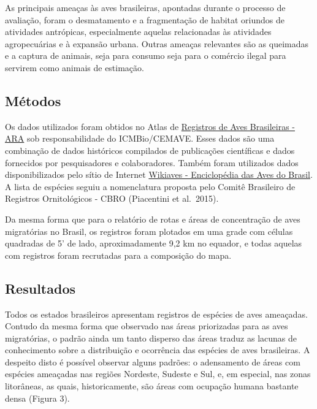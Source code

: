 \documentclass[
]{scrbook}
\begin{document}
As principais ameaças às aves brasileiras, apontadas durante o processo de avaliação, foram o desmatamento e a fragmentação de habitat oriundos de atividades antrópicas, especialmente aquelas relacionadas às atividades agropecuárias e à expansão urbana. Outras ameaças relevantes são as queimadas e a captura de animais, seja para consumo seja para o comércio ilegal para servirem como animais de estimação.

\hypertarget{metodos2}{%
\subsection{Métodos}\label{metodos2}}

Os dados utilizados foram obtidos no Atlas de \href{http://ara.cemave.gov.br}{Registros de Aves Brasileiras - ARA} sob responsabilidade do ICMBio/CEMAVE. Esses dados são uma combinação de dados históricos compilados de publicações científicas e dados fornecidos por pesquisadores e colaboradores. Também foram utilizados dados disponibilizados pelo sítio de Internet \href{http://www.wikiaves.com}{Wikiaves - Enciclopédia das Aves do Brasil}. A lista de espécies seguiu a nomenclatura proposta pelo Comitê Brasileiro de Registros Ornitológicos - CBRO (Piacentini et al.~2015).

Da mesma forma que para o relatório de rotas e áreas de concentração de aves migratórias no Brasil, os registros foram plotados em uma grade com células quadradas de 5' de lado, aproximadamente 9,2 km no equador, e todas aquelas com registros foram recrutadas para a composição do mapa.

\hypertarget{resultados2}{%
\subsection{Resultados}\label{resultados2}}

Todos os estados brasileiros apresentam registros de espécies de aves ameaçadas. Contudo da mesma forma que observado nas áreas priorizadas para as aves migratórias, o padrão ainda um tanto disperso das áreas traduz as lacunas de conhecimento sobre a distribuição e ocorrência das espécies de aves brasileiras. A despeito disto é possível observar alguns padrões: o adensamento de áreas com espécies ameaçadas nas regiões Nordeste, Sudeste e Sul, e, em especial, nas zonas litorâneas, as quais, historicamente, são áreas com ocupação humana bastante densa (Figura 3).
\end{document}
